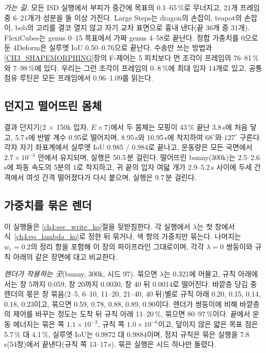\textit{가는 길.} 모든 ISD 실행에서 부피가 중간에 목표의 0.1--65\,\%로 무너지고, 21개 프레임 중 6--21개가 성분을 둘 이상 가진다.
Large Steps는 dragon의 손잡이, teapot의 손잡이, bob의 고리를 결코 열지 않고 자기 교차 표면으로 흉내 낸다(끝 36개 중 31개).
FlexiCubes는 genus 0--15 목표에서 가짜 genus 4--58로 끝난다. 정합 가중치를 0으로 둔 4Deform은 실루엣 IoU 0.50--0.76으로 끝난다. 수송만 쓰는
방법과 \ref{CH3_SHAPEMORPHING}장의 F-제어는 5 피치보다 먼 조각이 프레임의 76--81\,\%와 7--98\,\%에 있다. 우리는 그런 조각이
프레임의 0--8\,\%에 최대 입자 14개로 있고, 공통 점유 루틴은 모든 프레임에서 0.96--1.09를 읽는다.

\subsection{던지고 떨어뜨린 몸체}
결과 던지기(2 $\times$ 150k 입자, $E\times7$)에서 두 몸체는 모핑이 43\,\% 끝난 3.8\,s에 처음 닿고, 5.7\,s에 반발 계수 0.95로
떨어지며, 8.95\,s와 10.95\,s에 착지하여 $68^\circ$와 $127^\circ$ 구른다. 각자 자기 좌표계에서 실루엣 IoU 0.985 / 0.984로 끝나고,
운동량은 모든 국면에서 $2.7\times10^{-4}$ 안에서 유지되며, 실행은 50.5\,분 걸린다. 떨어뜨린 bunny(300k)는 2.5--2.6\,s에 파동
속도의 5분의 1로 착지하고, 귀 끝의 입자 여덟 개가 2.9--5.2\,s 사이에 두세 간격에서 여섯 간격 떨어졌다가 다시 붙으며, 실행은
9.7\,분 걸린다.

\subsection{가중치를 묶은 렌더}
\label{app:ch4_held_ko}
이 실행들은 \ref{ch4:sec_write_ko}절을 뒷받침한다. 각 실행에서 $\lambda$는 첫 창에서 식~\eqref{ch4:eq_lambda_ko}로 정한 뒤
묶거나, 색 항의 가중치만 묶는다. 나머지는 $w_c=0.2$의 정리 항을 포함해 이 장의 파이프라인 그대로이며, 각각 $\lambda=0$
쌍둥이와 규칙 아래의 같은 장면에 대고 비교한다.

\textit{렌더가 작용하는 곳}(bunny, 300k, 시드 97). 묶으면 $\lambda$는 0.321에 머물고, 규칙 아래에서는 창 5까지 0.059, 창
20까지 0.0030, 창 40 뒤 0.0014로 떨어진다. 바깥층 당김 중 렌더의 몫은 창 묶음(2--5, 6--10, 11--20, 21--40, 40 뒤)별로 규칙
아래 0.20, 0.15, 0.14, 0.18, 0.23이고, 묶으면 0.59, 0.78, 0.88, 0.89, 0.90이다. 렌더가 쌍둥이에 비해 바깥층의 제어를 바꾸는
정도는 도착 뒤 규칙 아래 11--20\,\%, 묶으면 80--97\,\%이다. 끝에서 운동 에너지는 묶은 쪽 $1.1\times10^{-3}$, 규칙 쪽
$1.0\times10^{-6}$이고, 덮이지 않은 얇은 목표 점은 5.7\,\% 대 4.1\,\%, 실루엣 IoU는 0.9872 대 0.9884이며, 정지 규칙은 묶은
실행을 7.8\,s(54창)에서 끝낸다(규칙 쪽 13--17\,s). 묶은 실행은 시드 하나만 돌렸다.

